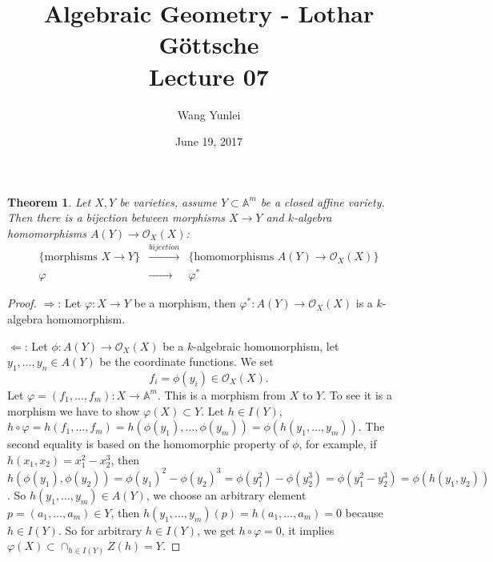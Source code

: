 \documentclass{amsart}
\theoremstyle{plain}
\newtheorem{theorem}{Theorem}
\theoremstyle{definition}
\theoremstyle{remark}
\numberwithin{equation}{section}
\begin{document}
\title[Complete-simple distributive lattices]
{Algebraic Geometry - Lothar G\"{o}ttsche \\
	Lecture 07}
\author{Wang Yunlei}
\date{June 19, 2017}
 
\maketitle


\begin{theorem}\label{12}
	Let $ X,Y $ be varieties, assume $ Y\subset \mathbb{A}^m $ be a closed affine variety. Then there is a bijection between morphisms $ X\to Y $ and $ k $-algebra homomorphisms $ A(Y)\to \mathcal{O}_X(X) $:
	$$\begin{array}{ccc}
	\{ \text{morphisms } X\to Y \} & \xrightarrow{bijection} & \{ \text{homomorphisms }A(Y)\to \mathcal{O}_X(X) \} \\
	\varphi & \xrightarrow{\qquad\quad} & \varphi^\ast
	\end{array}$$
\end{theorem}
\begin{proof}
	$ \Rightarrow $: Let $ \varphi :X\to Y $ be a morphism, then $ \varphi^\ast: A(Y)\to \mathcal{O}_X(X) $ is a $ k $-algebra homomorphism.
	
	$ \Leftarrow $: Let $\phi:A(Y)\to \mathcal{O}_X(X)  $ be a $ k $-algebraic homomorphism, let $ y_1,\dots,y_n\in A(Y) $ be the coordinate functions. We set
	$$
	f_i=\phi(y_i)\in \mathcal{O}_X(X).
	$$
	Let $ \varphi=(f_1,\dots,f_m):X\to \mathbb{A}^m $.
	This is a morphism from $ X $ to $ Y $. To see it is a morphism we have to show $ \varphi(X)\subset Y $. Let $ h\in I(Y) $, $ h\circ \varphi =h(f_1,\dots,f_m)=h(\phi(y_1),\dots,\phi(y_m))=\phi (h(y_1,\dots,y_m)) $. The second equality is based on the homomorphic property of $ \phi $, for example, if $ h(x_1,x_2)=x_1^2-x_2^3 $, then $ h(\phi(y_1),\phi(y_2))=\phi(y_1)^2-\phi(y_2)^3= \phi(y_1^2)-\phi(y_2^3)=\phi(y_1^2-y_2^3)=\phi(h(y_1,y_2)) $. So $ h(y_1,\dots,y_m)\in A(Y) $, we choose an arbitrary element $ p=(a_1,\dots,a_m)\in Y $, then $ h(y_1,\dots,y_m)(p)=h(a_1,\dots,a_m)=0 $ because $ h\in I(Y) $. So for arbitrary $ h\in I(Y) $, we get $ h\circ\varphi=0 $, it implies $ \varphi(X)\subset \mathop{\cap}_{h\in I(Y)} Z(h)= Y $.
\end{proof}
\end{document}
